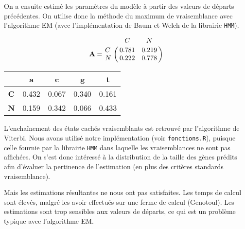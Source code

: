 \documentclass[12pt,a4paper]{article}
\begin{document}
On a ensuite estimé les paramètres du modèle à partir des valeurs de départs précédentes.
On utilise donc la méthode du maximum de vraisemblance avec l'algorithme EM (avec l'implémentation de Baum et Welch de la librairie \verb+HMM+).


\[
	\mathbf{A} = 
\bordermatrix{~ & C & N \cr
C & 0.781 & 0.219\cr
N & 0.222 & 0.778\cr}
\]

\begin{table}[!h]
	\centering
	\begin{tabular}{ccccc}
		& \textbf{a} & \textbf{c} & \textbf{g} & \textbf{t}\\
	\hline
	\textbf{C} &0.432 & 0.067 & 0.340 & 0.161\\ 
	\textbf{N} &0.159 & 0.342 & 0.066 & 0.433\\ 
	\hline
\end{tabular}
\end{table}

L'enchaînement des états cachés vraisemblants est retrouvé par l'algorithme de Viterbi.
Nous avons utilisé notre implémentation (voir \verb+fonctions.R+), puisque celle fournie par la librairie \verb+HMM+ dans laquelle les vraisemblances ne sont pas affichées.
On s'est donc intéressé à la distribution de la taille des gènes prédits afin d'évaluer la pertinence de l'estimation (en plus des critères standards vraisemblance).


Mais les estimations résultantes ne nous ont pas satisfaites.
Les temps de calcul sont élevés, malgré les avoir effectués sur une ferme de calcul (Genotoul). 
Les estimations sont trop sensibles aux valeurs de départs, ce qui est un problème typique avec l'algorithme EM.

\end{document}
